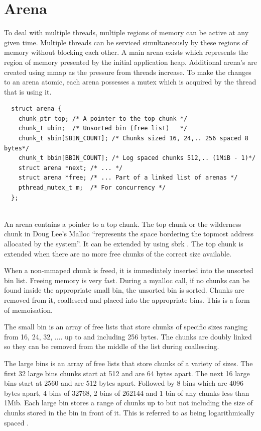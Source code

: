 \documentclass{article}
\begin{document}
\section{Arena}

To deal with multiple threads, multiple regions of memory can be active at any given time. Multiple threads can be serviced simultaneously by these regions of memory without blocking each other. A main arena exists which represents the region of memory presented by the initial application heap. Additional arena's are created using mmap as the pressure from threads increase. To make the changes to an arena atomic, each arena possesses a mutex which is acquired by the thread that is using it. \cite{mallocinternals}

\newpage

\begin{lstlisting}
  struct arena {
    chunk_ptr top; /* A pointer to the top chunk */
    chunk_t ubin;  /* Unsorted bin (free list)   */
    chunk_t sbin[SBIN_COUNT]; /* Chunks sized 16, 24,.. 256 spaced 8 bytes*/
    chunk_t bbin[BBIN_COUNT]; /* Log spaced chunks 512,.. (1MiB - 1)*/
    struct arena *next; /* ... */
    struct arena *free; /* ... Part of a linked list of arenas */
    pthread_mutex_t m;  /* For concurrency */
  };
  
\end{lstlisting}

An arena contains a pointer to a top chunk. The top chunk or the wilderness chunk in Doug Lee's Malloc ``represents the space bordering the topmost address allocated by the system''. It can be extended by using sbrk \cite{douglee}. The top chunk is extended when there are no more free chunks of the correct size available.

When a non-mmaped chunk is freed, it is immediately inserted into the unsorted bin list. Freeing memory is very fast. During a myalloc call, if no chunks can be found inside the appropriate small bin, the unsorted bin is sorted. Chunks are removed from it, coallesced and placed into the appropriate bins. This is a form of memoisation.

The small bin is an array of free lists that store chunks of specific sizes ranging from 16, 24, 32, .... up to and including 256 bytes. The chunks are doubly linked so they can be removed from the middle of the list during coallescing.

The large bins is an array of free lists that store chunks of a variety of sizes. The first 32 large bins chunks start at 512 and are 64 bytes apart. The next 16 large bins start at 2560 and are 512 bytes apart. Followed by 8 bins which are 4096 bytes apart, 4 bins of 32768, 2 bins of 262144 and 1 bin of any chunks less than 1Mib. Each large bin stores a range of chunks up to but not including the size of chunks stored in the bin in front of it. This is referred to  as being logarithmically spaced \cite{sploitfun}.
\end{document}
